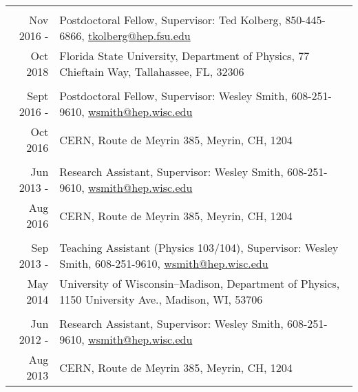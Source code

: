 \documentclass[letterpaper,11pt]{article} %
\begin{document}
\begin{tabulary}{\textwidth}{RL}
\vspace{5pt} \\

Nov 2016 -     & Postdoctoral Fellow, Supervisor: Ted Kolberg, 850-445-6866, \href{mailto:tkolberg@hep.fsu.edu}{tkolberg@hep.fsu.edu} \\
 Oct 2018      & Florida State University, Department of Physics, 77 Chieftain Way, Tallahassee, FL, 32306 \\ %

\vspace{5pt} \\

Sept 2016 -    & Postdoctoral Fellow, Supervisor: Wesley Smith, 608-251-9610, \href{mailto:wsmith@hep.wisc.edu}{wsmith@hep.wisc.edu} \\
 Oct 2016      & CERN, Route de Meyrin 385, Meyrin, CH, 1204 \\ %

\vspace{5pt} \\

Jun 2013 -     & Research Assistant, Supervisor: Wesley Smith, 608-251-9610, \href{mailto:wsmith@hep.wisc.edu}{wsmith@hep.wisc.edu} \\
 Aug 2016      & CERN, Route de Meyrin 385, Meyrin, CH, 1204 \\ %

\vspace{5pt} \\

Sep 2013 -     & Teaching Assistant (Physics 103/104), Supervisor: Wesley Smith, 608-251-9610, \href{mailto:wsmith@hep.wisc.edu}{wsmith@hep.wisc.edu} \\
 May 2014      & University of Wisconsin--Madison, Department of Physics, 1150 University Ave., Madison, WI, 53706 \\ %

\vspace{5pt} \\

Jun 2012 -     & Research Assistant, Supervisor: Wesley Smith, 608-251-9610, \href{mailto:wsmith@hep.wisc.edu}{wsmith@hep.wisc.edu} \\
 Aug 2013      & CERN, Route de Meyrin 385, Meyrin, CH, 1204 \\ %


\end{tabulary}
\end{document}
